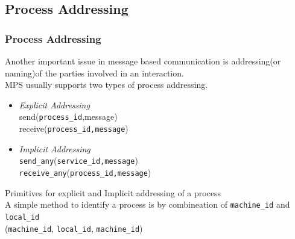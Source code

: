 \documentclass{beamer}
\begin{document}
\subsection{Process Addressing}
\begin{frame}
	\frametitle{Process Addressing}
	Another important issue in message based communication is addressing(or naming)of the
	parties involved in an interaction.\\MPS usually supports two types of process
	addressing.
	\vspace{0.25cm}
	\begin{itemize}
		\item \textit{Explicit Addressing}\\
		send(\texttt{process\_id},message)\\
		receive(\texttt{process\_id,message})\\
		\item \textit{Implicit Addressing}\\
		\texttt{send\_any}(\texttt{service\_id,message})\\
		\texttt{receive\_any}(\texttt{process\_id,message})\\
	\end{itemize}
	\vspace{0.25cm}
	Primitives for explicit and Implicit addressing of a process\\
	
	\vspace{0.25cm}
	A simple method to identify a process is by combineation of \texttt{machine\_id} and \texttt{local\_id}\\
	\hspace{2cm}(\texttt{machine\_id}, \texttt{local\_id},  \texttt{machine\_id})
\end{frame}
\end{document}
